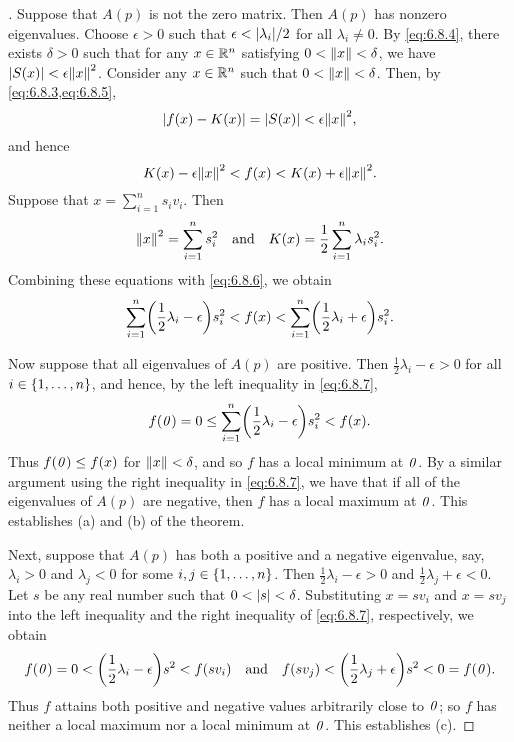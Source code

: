 \begin{proof}[]
  Suppose that \(A(p)\) is not the zero matrix.
  Then \(A(p)\) has nonzero eigenvalues.
  Choose \(\epsilon > 0\) such that \(\epsilon < \abs{\lambda_i} / 2\) for all \(\lambda_i \neq 0\).
  By \cref{eq:6.8.4}, there exists \(\delta > 0\) such that for any \(x \in \mathbb{R}^n\) satisfying \(0 < \left\lVert x\right\rVert < \delta\), we have \(\abs{S(x)} < \epsilon \norm{x}^2\).
  Consider any \(x \in \mathbb{R}^n\) such that \(0 < \left\lVert x\right\rVert < \delta\).
  Then, by \cref{eq:6.8.3,eq:6.8.5},
  \[
    \abs{f(x) - K(x)} = \abs{S(x)} < \epsilon \norm{x}^2,
  \]
  and hence
  \begin{equation}\label{eq:6.8.6}
    K(x) - \epsilon \norm{x}^2 < f(x) < K(x) + \epsilon \norm{x}^2.
  \end{equation}
  Suppose that \(x = \sum_{i = 1}^n s_i v_i\).
  Then
  \[
    \left\lVert x\right\rVert^2 = \sum_{i = 1}^n s_i^2 \quad \text{and} \quad K(x) = \frac{1}{2} \sum_{i = 1}^n \lambda_i s_i^2.
  \]
  Combining these equations with \cref{eq:6.8.6}, we obtain
  \begin{equation}\label{eq:6.8.7}
    \sum_{i = 1}^n \pa{\frac{1}{2} \lambda_i - \epsilon} s_i^2 < f(x) < \sum_{i = 1}^n \pa{\frac{1}{2} \lambda_i + \epsilon} s_i^2.
  \end{equation}

  Now suppose that all eigenvalues of \(A(p)\) are positive.
  Then \(\frac{1}{2} \lambda_i - \epsilon > 0\) for all \(i \in \left\lbrace1, \dots, n\right\rbrace\), and hence, by the left inequality in \cref{eq:6.8.7},
  \[
    f(\zv) = 0 \leq \sum_{i = 1}^n \pa{\frac{1}{2} \lambda_i - \epsilon} s_i^2 < f(x).
  \]
  Thus \(f(\mathit{0}) \leq f(x)\) for \(\left\lVert x\right\rVert < \delta\), and so \(f\) has a local minimum at \(\mathit{0}\).
  By a similar argument using the right inequality in \cref{eq:6.8.7}, we have that if all of the eigenvalues of \(A(p)\) are negative, then \(f\) has a local maximum at \(\mathit{0}\).
  This establishes (a) and (b) of the theorem.

  Next, suppose that \(A(p)\) has both a positive and a negative eigenvalue, say, \(\lambda_i > 0\) and \(\lambda_j < 0\) for some \(i, j \in \left\lbrace1, \dots, n\right\rbrace\).
  Then \(\frac{1}{2} \lambda_i - \epsilon > 0\) and \(\frac{1}{2} \lambda_j + \epsilon < 0\).
  Let \(s\) be any real number such that \(0 < \left\lvert s\right\rvert < \delta\).
  Substituting \(x = s v_i\) and \(x = s v_j\) into the left inequality and the right inequality of \cref{eq:6.8.7}, respectively, we obtain
  \[
    f(\zv) = 0 < \pa{\frac{1}{2} \lambda_i - \epsilon} s^2 < f(s v_i) \quad \text{and} \quad f(s v_j) < \pa{\frac{1}{2} \lambda_j + \epsilon} s^2 < 0 = f(\zv).
  \]
  Thus \(f\) attains both positive and negative values arbitrarily close to \(\mathit{0}\);
  so \(f\) has neither a local maximum nor a local minimum at \(\mathit{0}\).
  This establishes (c).


\end{proof}
